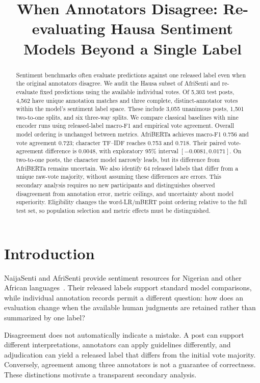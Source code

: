 \documentclass[conference]{IEEEtran}
\title{When Annotators Disagree: Re-evaluating Hausa Sentiment Models
Beyond a Single Label}
\author{
\IEEEauthorblockN{Jeff Karau Dauda}
\IEEEauthorblockA{\href{mailto:jeff@robopotato.co}{jeff@robopotato.co}}
\and
\IEEEauthorblockN{Moussa Moustapha}
\IEEEauthorblockA{\href{mailto:moussa@robopotato.co}{moussa@robopotato.co}}
\and
\IEEEauthorblockN{David Emmanuel}
\IEEEauthorblockA{\href{mailto:david@robopotato.co}{david@robopotato.co}}
}
\begin{document}
\maketitle

\begin{abstract}
Sentiment benchmarks often evaluate predictions against one released label
even when the original annotators disagree. We audit the Hausa subset of
AfriSenti and re-evaluate fixed predictions using the available individual
votes. Of 5,303 test posts, 4,562 have unique annotation matches and three
complete, distinct-annotator votes within the model's sentiment label space.
These include 3,055 unanimous posts, 1,501 two-to-one splits, and six
three-way splits. We compare classical baselines with nine encoder runs
using released-label macro-F1 and empirical vote agreement. Overall model
ordering is unchanged between metrics. AfriBERTa achieves macro-F1 0.756
and vote agreement 0.723; character TF--IDF reaches 0.753 and 0.718.
Their paired vote-agreement difference is 0.0048, with exploratory 95\%
interval $[-0.0081,0.0171]$. On two-to-one posts, the character model narrowly
leads, but its difference from AfriBERTa remains uncertain. We also identify
64 released labels that differ from a unique raw-vote majority, without
assuming these differences are errors. This secondary analysis requires
no new participants and distinguishes observed disagreement from annotation
error, metric ceilings, and uncertainty about model superiority.
Eligibility changes the word-LR/mBERT point ordering relative to the full test
set, so population selection and metric effects must be distinguished.
\end{abstract}

\section{Introduction}
NaijaSenti and AfriSenti provide sentiment resources for Nigerian and other
African languages~\cite{naijasenti,afrisenti}. Their released labels support
standard model comparisons, while individual annotation records permit a
different question: how does an evaluation change when the available human
judgments are retained rather than summarized by one label?

Disagreement does not automatically indicate a mistake. A post can support
different interpretations, annotators can apply guidelines differently, and
adjudication can yield a released label that differs from the initial vote
majority. Conversely, agreement among three annotators is not a guarantee of
correctness. These distinctions motivate a transparent secondary analysis.
\end{document}
